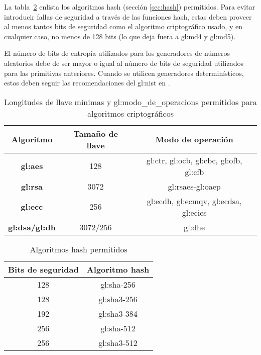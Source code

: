 La tabla~\ref{hash_permitidos} enlista los algoritmos hash (sección
\ref{sec:hash}) permitidos. Para evitar introducir fallas de seguridad a
través de las funciones hash, estas deben proveer al menos tantos bits de
seguridad como el algoritmo criptográfico usado, y en cualquier caso, no
menos de 128 bits (lo que deja fuera a \gls{gl:md4} y \gls{gl:md5}).

El número de bits de entropía utilizados para los generadores de números
aleatorios debe de ser mayor o igual al número de bits de seguridad utilizados
para las primitivas anteriores. Cuando se utilicen generadores determinísticos,
estos deben seguir las recomendaciones del \gls{gl:nist} en
\cite{nist_aleatorios}.

\newpage

\begin{table}[H]
  \centering
  \begin{tabular}{| c | c | c |}
    \hline
    \textbf{Algoritmo} &
    \textbf{Tamaño de llave} &
    \textbf{Modo de operación} \\ [0.5ex]
    \hline
    \textbf{\gls{gl:aes}} &
    128 &
    \acrshort{gl:ctr},
    \acrshort{gl:ocb},
    \acrshort{gl:cbc},
    \acrshort{gl:ofb},
    \acrshort{gl:cfb} \\
    \hline
    \textbf{\gls{gl:rsa}} &
    3072 &
    \acrshort{gl:rsaes}-\acrshort{gl:oaep} \\
    \hline
    \textbf{\gls{gl:ecc}} &
    256 &
    \acrshort{gl:ecdh},
    \acrshort{gl:ecmqv},
    \acrshort{gl:ecdsa},
    \acrshort{gl:ecies} \\
    \hline
    \textbf{\gls{gl:dsa}/\gls{gl:dh}} &
    3072/256 &
    \acrshort{gl:dhe}\\
    \hline
  \end{tabular}
  \caption{Longitudes de llave mínimas y \glspl{gl:modo_de_operacion}
      permitidos para algoritmos criptográficos}
  \label{minimo_llaves}
\end{table}

\begin{table}[H]
  \centering
  \begin{tabular}{| c | c |}
    \hline
    \textbf{Bits de seguridad} &
    \textbf{Algoritmo hash} \\ [0.5ex]
    \hline
    128 & \gls{gl:sha}-256 \\
    \hline
    128 & \gls{gl:sha}3-256 \\
    \hline
    192 & \gls{gl:sha}3-384 \\
    \hline
    256 & \gls{gl:sha}-512 \\
    \hline
    256 & \gls{gl:sha}3-512 \\
    \hline
  \end{tabular}
  \caption{Algoritmos hash permitidos}
  \label{hash_permitidos}
\end{table}
